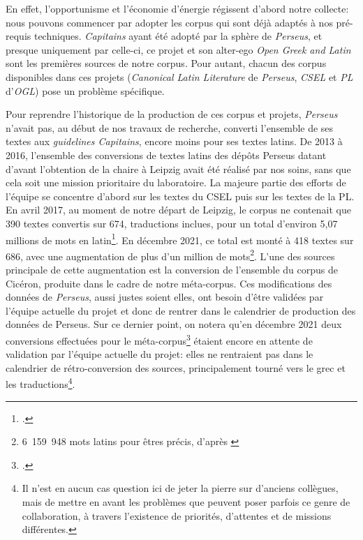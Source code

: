 En effet, l'opportunisme et l'économie d'énergie régissent d'abord notre collecte: nous pouvons commencer par adopter les corpus qui sont déjà adaptés à nos pré-requis techniques. \textit{Capitains} ayant été adopté par la sphère de \textit{Perseus}, et presque uniquement par celle-ci, ce projet et son alter-ego \textit{Open Greek and Latin} sont les premières sources de notre corpus. Pour autant, chacun des corpus disponibles dans ces projets (\textit{Canonical Latin Literature} de \textit{Perseus}, \textit{CSEL} et \textit{PL} d'\textit{OGL}) pose un problème spécifique.

Pour reprendre l'historique de la production de ces corpus et projets, \textit{Perseus} n'avait pas, au début de nos travaux de recherche, converti l'ensemble de ses textes aux \textit{guidelines Capitains}, encore moins pour ses textes latins. De 2013 à 2016, l'ensemble des conversions de textes latins des dépôts Perseus datant d'avant l'obtention de la chaire à Leipzig avait été réalisé par nos soins, sans que cela soit une mission prioritaire du laboratoire. La majeure partie des efforts de l'équipe se concentre d'abord sur les textes du CSEL puis sur les textes de la PL. En avril 2017, au moment de notre départ de Leipzig, le corpus ne contenait que 390 textes convertis sur 674, traductions inclues, pour un total d'environ 5,07 millions de mots en latin\footcite{travis_hook_2017, travis_hook_2017_logs}. En décembre 2021, ce total est monté à 418 textes sur 686, avec une augmentation de plus d'un million de mots\footnote{6~159~948 mots latins pour êtres précis, d'après \textcite{travis_hook_2021_logs}}. L'une des sources principale de cette augmentation est la conversion de l'ensemble du corpus de Cicéron, produite dans le cadre de notre méta-corpus. Ces modifications des données de \textit{Perseus}, aussi justes soient elles, ont besoin d'être validées par l'équipe actuelle du projet et donc de rentrer dans le calendrier de production des données de Perseus. Sur ce dernier point, on notera qu'en décembre 2021 deux conversions effectuées pour le méta-corpus\footcite{noauthor_pull_nodate} étaient encore en attente de validation par l'équipe actuelle du projet: elles ne rentraient pas dans le calendrier de rétro-conversion des sources, principalement tourné vers le grec et les traductions\footnote{Il n'est en aucun cas question ici de jeter la pierre sur d'anciens collègues, mais de mettre en avant les problèmes que peuvent poser parfois ce genre de collaboration, à travers l'existence de priorités, d'attentes et de missions différentes.}. 

